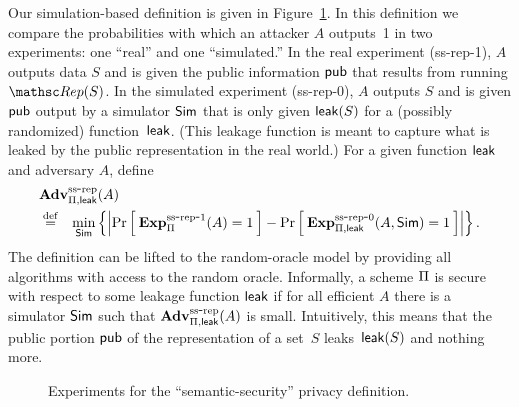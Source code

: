 Our simulation-based definition is given in
Figure~\ref{fig:privacy-ss}.
In this definition we compare the probabilities with which an attacker $A$ outputs~1
in two experiments: one ``real'' and one ``simulated.''
In the real experiment (ss-rep-1), $A$ outputs data $S$  and is given the
public information ${\sf pub}$ that results from running $\Rep(S)$.
In the simulated experiment (ss-rep-0), $A$ outputs $S$ and is given ${\sf pub}$ output
by a simulator ${\sf Sim}$ that is only given ${\sf leak}(S)$ for a (possibly randomized)
function~${\sf leak}$. (This leakage function is meant to capture what is leaked
by the public representation in the real world.)
For a given function ${\sf leak}$ and adversary $A$,
define
\begin{eqnarray*}
\lefteqn{\AdvPrivSS{\setprim,{\sf leak}}{A}} \\
& \bydef & \min_{\Sim} \left\{
\left| \Prob{\ExpPrivSSreal{\setprim}{A}=1} -
\Prob{\ExpPrivSSsim{\setprim,{\sf leak}}{A, \Sim}=1} \right|\right\}.\end{eqnarray*}
The definition can be lifted to the random-oracle model by providing
all algorithms with access to the
random oracle.
Informally, a scheme $\Pi$ is secure with respect to some leakage function ${\sf leak}$
if for all efficient $A$ there is a simulator ${\sf Sim}$ such that
$\mathrm{\mathbf{Adv}}^{\mathrm{ss\mbox{-}rep}}_{\Pi,{\sf leak}}(A)$ is small.
Intuitively, this means that the public portion
${\sf pub}$ of the representation of a set~$S$ leaks~${\sf leak}(S)$ and nothing more.

\begin{figure}[tb]
\centering
{}
\caption{Experiments for the ``semantic-security'' privacy
  definition.}
\label{fig:privacy-ss}
\end{figure}


